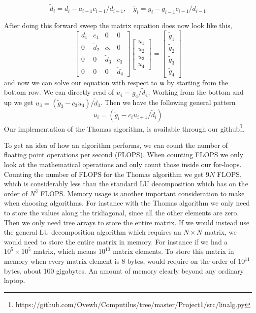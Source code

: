 \begin{equation}
  \tilde{d}_i = d_i- a_{i-1} c_{i-1}/d_{i-1}, \quad \tilde{g}_i =  g_i - g_{i-1} c_{i-1}/d_{i-1}
\end{equation}

After doing this forward sweep the matrix equation does now look like this,
\begin{equation*}
  \begin{bmatrix}
    d_1 & c_1 & 0 & 0 \\
    0 & \tilde{d}_2 & c_2 & 0 \\
    0 & 0 & \tilde{d}_3 & c_3  \\
    0 & 0 & 0 & \tilde{d}_4
  \end{bmatrix} \begin{bmatrix}
    u_1 \\ u_2 \\ u_3 \\ u_4
  \end{bmatrix} = \begin{bmatrix}
    \tilde{g}_1 \\ \tilde{g}_2 \\ \tilde{g}_3 \\ \tilde{g}_4
  \end{bmatrix}
\end{equation*}
and now we can solve our equation with respect to $\mathbf{u}$ by starting from
the bottom row. We can directly read of $u_4 = \tilde{g}_4 / \tilde{d}_4$.
Working from the bottom and up we get $u_3 = \left(\tilde{g}_3-c_3
u_4\right)/\tilde{d}_3$. Then we have the following general pattern
\begin{equation}
  u_i = \left(\tilde{g}_i - c_i u_{i+1}/\tilde{d}_i \right)
\end{equation}
Our implementation of the Thomas algorithm, is available
through our github\footnote{https://github.com/Ovewh/Computilus/tree/master/Project1/src/linalg.py}.

To get an idea of how an algorithm performs, we can count
the number of floating point operations per second (FLOPS). When counting FLOPS
we only look at the mathematical operations and only count those inside our
for-loops. Counting the number of FLOPS for the Thomas algorithm we get $9N$
FLOPS, which is considerably less than the standard LU decomposition which has
on the order of $N^3$ FLOPS.
Memory usage is another important consideration to make when choosing
algorithms. For instance with the Thomas algorithm we only need to store the
values along the tridiagonal, since all the other elements are zero. Then we only need tree arrays to store the entire matrix. If we
would instead use the general LU decomposition algorithm which requires an $N
\times N$ matrix, we would need to store the entire matrix in memory. For
instance if we had a $10^5 \times 10^5$ matrix, which means $10^{10}$ matrix
elements. To store this matrix in memory when
every matrix element is 8 bytes, would require on the order of $10^{11}$
bytes, about 100 gigabytes. An amount of memory clearly beyond any
ordinary laptop. 

